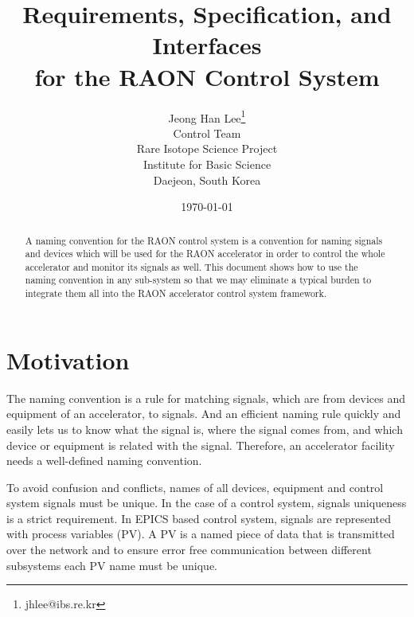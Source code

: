 \documentclass[11pt
  , a4paper
  , article
  , oneside
]{memoir}
\begin{document}
\newcommand{\technumber}{
  RAON Control-Document Series\\
  Revision : v0.1,   Release : Nov, 19, 2014}
\title{\textbf{Requirements, Specification, and Interfaces \\ for the RAON Control System}}

\author{Jeong Han Lee\thanks{jhlee@ibs.re.kr} \\
  Control Team \\
  Rare Isotope Science Project\\
  Institute for Basic Science\\
  Daejeon, South Korea
}
\date{\today}

\renewcommand{\maketitlehooka}{\begin{flushright}\textsf{\technumber}\end{flushright}}

\maketitle

\begin{abstract}
A naming convention for the RAON control system is a convention for naming signals and devices which will be used for the RAON accelerator in order to control the whole accelerator and monitor its signals as well. This document shows how to use the naming convention in any sub-system so that we may eliminate a typical burden to integrate them all into the RAON accelerator control system framework. 
\end{abstract}



\chapter{Motivation}
The naming convention is a rule for matching signals, which are from devices and equipment of an accelerator, to signals. And an efficient naming rule quickly and easily lets us to know what the signal is, where the signal comes from, and which device or equipment is related with the signal. Therefore, an accelerator facility needs a well-defined naming convention.  

To avoid confusion and conflicts, names of all devices, equipment and control system signals must be unique. In the case of a control system, signals uniqueness is a strict requirement. In EPICS based control system, signals are represented with process variables (PV). A PV is a named piece of data that is transmitted over the network and to ensure error free communication between different subsystems each PV name must be unique. 
\end{document}
